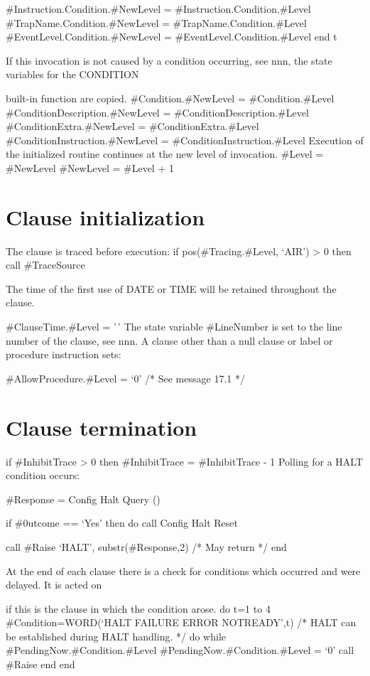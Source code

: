 \#Instruction.Condition.\#NewLevel = \#Instruction.Condition.\#Level
\#TrapName.Condition.\#NewLevel = \#TrapName.Condition.\#Level
\#EventLevel.Condition.\#NewLevel = \#EventLevel.Condition.\#Level end t

If this invocation is not caused by a condition occurring, see nnn, the
state variables for the CONDITION

built-in function are copied. \#Condition.\#NewLevel =
\#Condition.\#Level \#ConditionDescription.\#NewLevel =
\#ConditionDescription.\#Level \#ConditionExtra.\#NewLevel =
\#ConditionExtra.\#Level \#ConditionInstruction.\#NewLevel =
\#ConditionInstruction.\#Level Execution of the initialized routine
continues at the new level of invocation. \#Level = \#NewLevel
\#NewLevel = \#Level + 1

\section{Clause initialization}\label{clause-initialization}

The clause is traced before execution: if pos(\#Tracing.\#Level, `AIR')
\textgreater{} 0 then call \#TraceSource

The time of the first use of DATE or TIME will be retained throughout
the clause.

\#ClauseTime.\#Level = '\,' The state variable \#LineNumber is set to
the line number of the clause, see nnn. A clause other than a null
clause or label or procedure instruction sets:

\#AllowProcedure.\#Level = `0' /* See message 17.1 */

\section{Clause termination}\label{clause-termination}

if \#InhibitTrace \textgreater{} 0 then \#InhibitTrace = \#InhibitTrace
- 1 Polling for a HALT condition occurs:

\#Response = Config Halt Query ()

if \#0utcome == `Yes' then do call Config Halt Reset

call \#Raise `HALT', substr(\#Response,2) /* May return */ end

At the end of each clause there is a check for conditions which occurred
and were delayed. It is acted on

if this is the clause in which the condition arose. do t=1 to 4
\#Condition=WORD(`HALT FAILURE ERROR NOTREADY',t) /* HALT can be
established during HALT handling. */ do while
\#PendingNow.\#Condition.\#Level \#PendingNow.\#Condition.\#Level = `0'
call \#Raise end end

